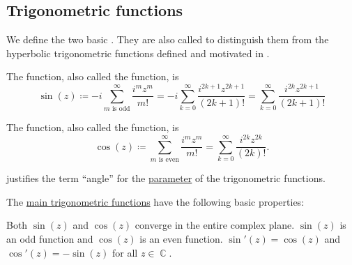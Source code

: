\subsection{Trigonometric functions}\label{subsec:trigonometric_functions}

\begin{definition}\label{def:trigonometric_functions}
  We define the two basic . They are also called  to distinguish them from the hyperbolic trigonometric functions defined and motivated in .

  \begin{thmenum}
     The  function, also called the  function, is
    \begin{equation*}
      \sin(z)
      \coloneqq
      -i \sum_{m \text{ is odd}}^\infty \frac {i^m z^m} {m!}
      =
      -i \sum_{k=0}^\infty \frac {i^{2k+1} z^{2k+1}} {(2k + 1)!}
      =
      \sum_{k=0}^\infty \frac {i^{2k} z^{2k+1}} {(2k + 1)!}
    \end{equation*}

     The  function, also called the  function, is
    \begin{equation*}
      \cos(z)
      \coloneqq
      \sum_{m \text{ is even}}^\infty \frac {i^m z^m} {m!}
      =
      \sum_{k=0}^\infty \frac {i^{2k} z^{2k}} {(2k)!}.
    \end{equation*}
  \end{thmenum}

   justifies the term \enquote{angle} for the \hyperref[def:multi_valued_function/arguments]{parameter} of the trigonometric functions.
\end{definition}
\begin{proposition}\label{thm:trigonometric_function_properties}
  The \hyperref[def:trigonometric_functions]{main trigonometric functions} have the following basic properties:
  \begin{thmenum}
     Both \( \sin(z) \) and \( \cos(z) \) converge in the entire complex plane.
     \( \sin(z) \) is an odd function and \( \cos(z) \) is an even function.
     \( \sin'(z) = \cos(z) \) and \( \cos'(z) = -\sin(z) \) for all \( z \in \BbbC \).
  \end{thmenum}
\end{proposition}
